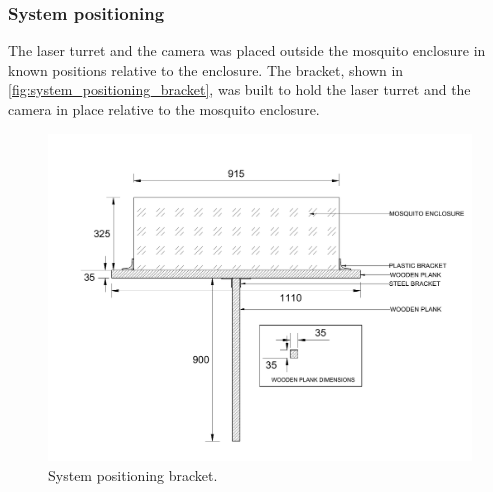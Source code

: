 \subsubsection{System positioning}\label{subsubsec:system_positioning}
The laser turret and the camera was placed outside the mosquito enclosure in known positions relative to the enclosure. The bracket, shown in \autoref{fig:system_positioning_bracket}, was built to hold the laser turret and the camera in place relative to the mosquito enclosure.
\begin{figure}[h]
    \centering
    \includegraphics[width=1\textwidth]{figures/hardware_design/system_positioning.pdf}
    \caption{System positioning bracket.}
    \label{fig:system_positioning_bracket}
\end{figure}


